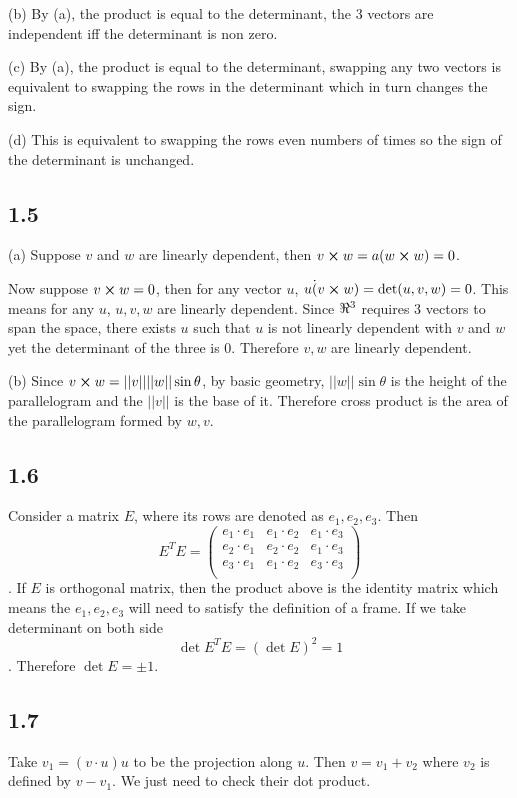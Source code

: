 \documentclass[12pt]{article}
\begin{document}
(b) By (a), the product is equal to the determinant, the 3 vectors are independent iff the determinant is non zero. 

(c) By (a),  the product is equal to the determinant, swapping any two vectors is equivalent to swapping the rows in the determinant which in turn changes the sign.

(d) This is equivalent to swapping the rows even numbers of times so the sign of the determinant is unchanged.

\subsection*{1.5}
(a) Suppose $v$ and $w$ are linearly dependent, then $v\cross w =a (w \cross w) = 0$. 

Now suppose $v \cross w = 0$, then for any vector $u$, $u \dot (v \cross w) = \det(u, v, w) = 0$. This means for any $u$,  $u,v,w$ are linearly dependent. Since $\real^3$ requires 3 vectors to span the space, there exists $u$ such that $u$ is not linearly dependent with $v$ and $w$ yet the determinant of the three is 0. Therefore $v, w$ are linearly dependent.

(b) Since $v \cross w= ||v|| ||w|| \sin \theta$, by basic geometry, $||w|| \sin \theta$ is the height of the parallelogram and the $||v||$ is the base of it. Therefore cross product is the area of the parallelogram formed by $w, v$.

\subsection*{1.6}
Consider a matrix $E$, where its rows are denoted as $e_1, e_2, e_3$. Then $$E^T E = \begin{pmatrix}
	e_1 \cdot e_1  & 	e_1 \cdot e_2  & 	e_1 \cdot e_3  \\
	e_2 \cdot e_1  & 	e_2 \cdot e_2  & 	e_1 \cdot e_3  \\
	e_3 \cdot e_1  & 	e_1 \cdot e_2  & 	e_3 \cdot e_3  \\
\end{pmatrix}$$.  
If $E$ is orthogonal matrix, then the product above is the identity matrix which means the $e_1, e_2, e_3$ will need to satisfy the definition of a frame. If we take determinant on both side
$$ \det{E^TE} = (\det E)^2 = 1$$.
Therefore $\det E = \pm 1$.

\subsection*{1.7}
Take $v_1 = (v\cdot u) u$ to be the projection along $u$. Then $v = v_1 + v_2$ where $v_2$ is defined by $v - v_1$. We just need to check their dot product. 
\end{document}
